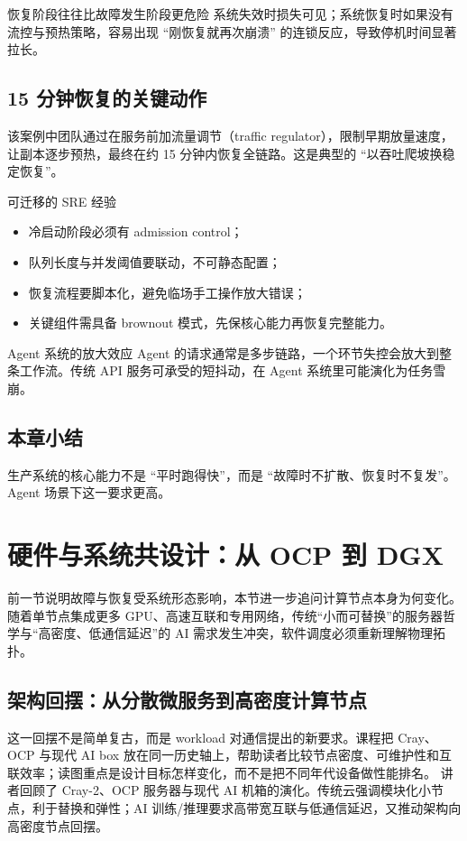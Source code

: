 \documentclass[a4paper]{article}
\begin{document}
\begin{importantbox}{恢复阶段往往比故障发生阶段更危险}
系统失效时损失可见；系统恢复时如果没有流控与预热策略，容易出现 ``刚恢复就再次崩溃'' 的连锁反应，导致停机时间显著拉长。
\end{importantbox}

\subsection{15 分钟恢复的关键动作}
该案例中团队通过在服务前加流量调节（traffic regulator），限制早期放量速度，让副本逐步预热，最终在约 15 分钟内恢复全链路。这是典型的 ``以吞吐爬坡换稳定恢复''。

\begin{knowledgebox}{可迁移的 SRE 经验}
\begin{itemize}
    \item 冷启动阶段必须有 admission control；
    \item 队列长度与并发阈值要联动，不可静态配置；
    \item 恢复流程要脚本化，避免临场手工操作放大错误；
    \item 关键组件需具备 brownout 模式，先保核心能力再恢复完整能力。
\end{itemize}
\end{knowledgebox}

\begin{warningbox}{Agent 系统的放大效应}
Agent 的请求通常是多步链路，一个环节失控会放大到整条工作流。传统 API 服务可承受的短抖动，在 Agent 系统里可能演化为任务雪崩。
\end{warningbox}

\subsection{本章小结}
生产系统的核心能力不是 ``平时跑得快''，而是 ``故障时不扩散、恢复时不复发''。Agent 场景下这一要求更高。

\section{硬件与系统共设计：从 OCP 到 DGX}

前一节说明故障与恢复受系统形态影响，本节进一步追问计算节点本身为何变化。随着单节点集成更多 GPU、高速互联和专用网络，传统“小而可替换”的服务器哲学与“高密度、低通信延迟”的 AI 需求发生冲突，软件调度必须重新理解物理拓扑。

\subsection{架构回摆：从分散微服务到高密度计算节点}
这一回摆不是简单复古，而是 workload 对通信提出的新要求。课程把 Cray、OCP 与现代 AI box 放在同一历史轴上，帮助读者比较节点密度、可维护性和互联效率；读图重点是设计目标怎样变化，而不是把不同年代设备做性能排名。
讲者回顾了 Cray-2、OCP 服务器与现代 AI 机箱的演化。传统云强调模块化小节点，利于替换和弹性；AI 训练/推理要求高带宽互联与低通信延迟，又推动架构向高密度节点回摆。
\end{document}
